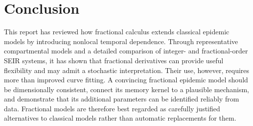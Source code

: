 \documentclass[00-main.tex]{subfiles}
\begin{document}
\section{Conclusion}

This report has reviewed how fractional calculus extends classical epidemic models by introducing nonlocal temporal dependence.
Through representative compartmental models and a detailed comparison of integer- and fractional-order SEIR systems, it has shown that fractional derivatives can provide useful flexibility and may admit a stochastic interpretation.
Their use, however, requires more than improved curve fitting.
A convincing fractional epidemic model should be dimensionally consistent, connect its memory kernel to a plausible mechanism, and demonstrate that its additional parameters can be identified reliably from data.
Fractional models are therefore best regarded as carefully justified alternatives to classical models rather than automatic replacements for them.

\ifSubfilesClassLoaded{\printbibliography}{}
\end{document}
